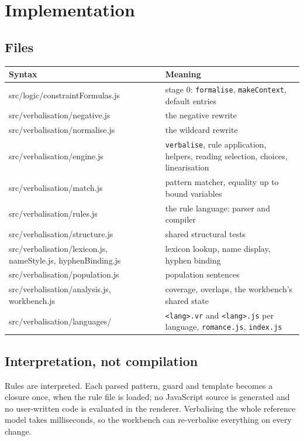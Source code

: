\documentclass[11pt, a4paper]{article}
\newcommand{\code}[1]{\texttt{\color{codefg}#1}}
\newenvironment{predtable}{%
  \begin{center}
  \begin{tabular}{>{\leavevmode\ttfamily\color{codefg}\raggedright\arraybackslash}p{0.38\textwidth} p{0.52\textwidth}}
  \toprule
  \normalfont\textbf{Syntax} & \textbf{Meaning} \\
  \midrule
}{%
  \bottomrule
  \end{tabular}
  \end{center}
}
\newcommand{\predrow}[2]{#1 & #2 \\[3pt]}
\begin{document}
\section{Implementation}

\subsection{Files}

\begin{predtable}
  \predrow{src/\allowbreak logic/\allowbreak constraintFormulas.js}{stage 0: \code{formalise}, \code{makeContext}, default entries}
  \predrow{src/\allowbreak verbalisation/\allowbreak negative.js}{the negative rewrite}
  \predrow{src/\allowbreak verbalisation/\allowbreak normalise.js}{the wildcard rewrite}
  \predrow{src/\allowbreak verbalisation/\allowbreak engine.js}{\code{verbalise}, rule application, helpers, reading selection, choices, linearisation}
  \predrow{src/\allowbreak verbalisation/\allowbreak match.js}{pattern matcher, equality up to bound variables}
  \predrow{src/\allowbreak verbalisation/\allowbreak rules.js}{the rule language: parser and compiler}
  \predrow{src/\allowbreak verbalisation/\allowbreak structure.js}{shared structural tests}
  \predrow{src/\allowbreak verbalisation/\allowbreak lexicon.js, nameStyle.js, hyphenBinding.js}{lexicon lookup, name display, hyphen binding}
  \predrow{src/\allowbreak verbalisation/\allowbreak population.js}{population sentences}
  \predrow{src/\allowbreak verbalisation/\allowbreak analysis.js, workbench.js}{coverage, overlaps, the workbench's shared state}
  \predrow{src/\allowbreak verbalisation/\allowbreak languages/}{\code{<lang>.vr} and \code{<lang>.js} per language, \code{romance.js}, \code{index.js}}
\end{predtable}

\subsection{Interpretation, not compilation}

Rules are interpreted. Each parsed pattern, guard and template becomes a
closure once, when the rule file is loaded; no JavaScript source is
generated and no user-written code is evaluated in the renderer. Verbalising
the whole reference model takes milliseconds, so the workbench can
re-verbalise everything on every change.

\end{document}
